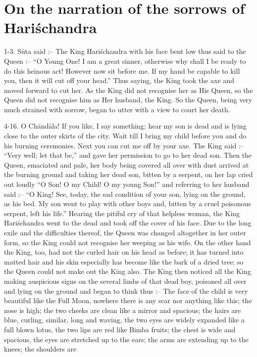 \chapter{On the narration of the sorrows of Hari\'schandra}

1-3. S\=uta said :-- The King Hari\'schandra with his face bent low thus said to the Queen :-- ``O Young One! I am a great sinner, otherwise why shall I be ready to do this heinous act! However now sit before me. If my hand be capable to kill you, then it will cut off your head.'' Thus saying, the King took the axe and moved forward to cut her. As the King did not recognise her as His Queen, so the Queen did not recognise him as Her husband, the King. So the Queen, being very much strained with sorrow, began to utter with a view to court her death.

4-16. O Ch\=and\=ala! If you like, I say something; hear my son is dead and is lying close to the outer skirts of the city. Wait till I bring my child before you and do his burning ceremonies. Next you can cut me off by your axe. The King said :-- ``Very well; let that be,'' and gave her permission to go to her dead son. Then the Queen, emaciated and pale, her body being covered all over with dust arrived at the burning ground and taking her dead son, bitten by a serpent, on her lap cried out loudly ``O Son! O my Child! O my young Son!'' and referring to her husband said :-- ``O King! See, today, the sad condition of your son, lying on the ground, as his bed. My son went to play with other boys and, bitten by a cruel poisonous serpent, left his life.'' Hearing the pitiful cry of that helpless woman, the King Hari\'schandra went to the dead and took off the cover of his face. Due to the long exile and the difficulties thereof, the Queen was changed altogether in her outer form, so the King could not recognise her weeping as his wife. On the other hand the King, too, had not the curled hair on his head as before; it has turned into matted hair and his skin especially has become like the bark of a dried tree; so the Queen could not make out the King also. The King then noticed all the King making auspicious signs on the several limbs of that dead boy, poisoned all over and lying on the ground and began to think thus :-- The face of the child is very beautiful like the Full Moon, nowhere there is any scar nor anything like this; the nose is high; the two cheeks are clean like a mirror and spacious; the hairs are blue, curling, similar, long and waving, the two eyes are widely expanded like a full blown lotus, the two lips are red like Bimba fruits; the chest is wide and spacious, the eyes are stretched up to the ears; the arms are extending up to the knees; the shoulders are

